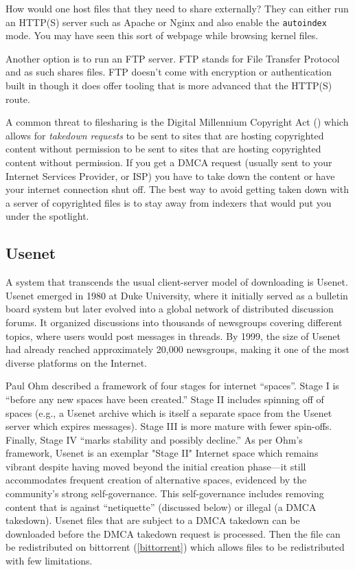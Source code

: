 How would one host files that they need to share externally? They can either run
an HTTP(S) server such as Apache or Nginx and also enable the \texttt{autoindex}
mode. You may have seen this sort of webpage while browsing kernel files.

Another option is to run an FTP server. FTP stands for File Transfer Protocol
and as such shares files. FTP doesn't come with encryption or authentication
built in though it does offer tooling that is more advanced that the HTTP(S)
route.

A common threat to filesharing is the Digital Millennium Copyright Act
(\cite{DigitalMillenniumCopyright2025}) which allows for \emph{takedown
      requests} to be sent to sites that are hosting copyrighted content without
permission to be sent to sites that are hosting copyrighted content without
permission. If you get a DMCA request (usually sent to your Internet Services
Provider, or ISP) you have to take down the content or have your internet
connection shut off. The best way to avoid getting taken down with a server of
copyrighted files is to stay away from indexers that would put you under the
spotlight.


\subsection{Usenet}\label{usenet}

A system that transcends the usual client-server model of downloading is Usenet.
Usenet emerged in 1980 at Duke University, where it initially served as a
bulletin board system but later evolved into a global network of distributed
discussion forums.\cite{HowUseUsenet} It organized discussions into thousands of
newsgroups covering different topics, where users would post messages in
threads. By 1999, the size of Usenet had already reached approximately 20,000
newsgroups, making it one of the most diverse platforms on the Internet.

Paul Ohm described a framework of four stages for internet ``spaces''. Stage I
is ``before any new spaces have been created.'' Stage II includes spinning off
of spaces (e.g., a Usenet archive which is itself a separate space from the
Usenet server which expires messages). Stage III is more mature with fewer
spin-offs. Finally, Stage IV ``marks stability and possibly decline.'' As per
Ohm's framework, Usenet is an exemplar "Stage II" Internet space which remains
vibrant despite having moved beyond the initial creation phase---it still
accommodates frequent creation of alternative spaces, evidenced by the
community's strong self-governance.\cite{ohmRegulatingInternetUsenet1998} This
self-governance includes removing content that is against ``netiquette''
(discussed below) or illegal (a DMCA takedown). Usenet files that are subject to
a DMCA takedown can be downloaded before the DMCA takedown request is processed.
Then the file can be redistributed on bittorrent (\ref{bittorrent}) which allows
files to be redistributed with few limitations.

